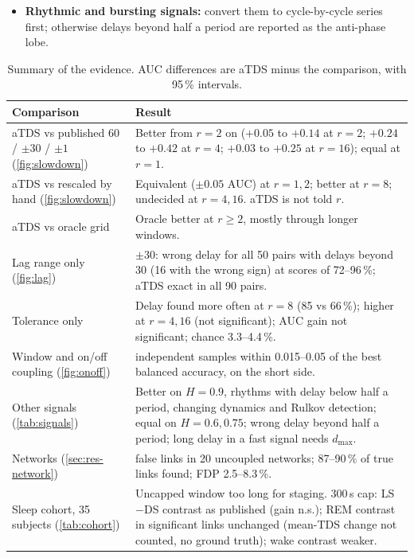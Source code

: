 \documentclass[11pt,a4paper]{article}
\begin{document}
\begin{itemize}
\item \textbf{Rhythmic and bursting signals:} convert them to cycle-by-cycle series first; otherwise delays beyond half a period are reported as the anti-phase lobe.
\end{itemize}

\begin{table}[t]
\centering
\caption{Summary of the evidence. AUC differences are aTDS minus the comparison, with 95\,\% intervals.}
\label{tab:summary}
\footnotesize
\begin{tabularx}{\textwidth}{>{\raggedright\arraybackslash}p{4.2cm}>{\raggedright\arraybackslash}X}
\toprule
Comparison & Result \\
\midrule
aTDS vs published 60 / $\pm30$ / $\pm1$ (\cref{fig:slowdown}) & Better from $r = 2$ on ($+0.05$ to $+0.14$ at $r = 2$; $+0.24$ to $+0.42$ at $r = 4$; $+0.03$ to $+0.25$ at $r = 16$); equal at $r = 1$. \\
aTDS vs rescaled by hand (\cref{fig:slowdown}) & Equivalent ($\pm0.05$ AUC) at $r = 1, 2$; better at $r = 8$; undecided at $r = 4, 16$. aTDS is not told $r$. \\
aTDS vs oracle grid & Oracle better at $r \ge 2$, mostly through longer windows. \\
Lag range only (\cref{fig:lag}) & $\pm30$: wrong delay for all 50 pairs with delays beyond 30 (16 with the wrong sign) at scores of 72--96\,\%; aTDS exact in all 90 pairs. \\
Tolerance only & Delay found more often at $r = 8$ (85 vs 66\,\%); higher at $r = 4, 16$ (not significant); AUC gain not significant; chance 3.3--4.4\,\%. \\
Window and on/off coupling (\cref{fig:onoff}) & 30 independent samples within 0.015--0.05 of the best balanced accuracy, on the short side. \\
Other signals (\cref{tab:signals}) & Better on $H = 0.9$, rhythms with delay below half a period, changing dynamics and Rulkov detection; equal on $H = 0.6, 0.75$; wrong delay beyond half a period; long delay in a fast signal needs $d_{\max}$. \\
Networks (\cref{sec:res-network}) & 0 false links in 20 uncoupled networks; 87--90\,\% of true links found; FDP 2.5--8.3\,\%. \\
Sleep cohort, 35 subjects (\cref{tab:cohort}) & Uncapped window too long for staging. 300\,s cap: LS$-$DS contrast as published (gain n.s.); REM contrast in significant links unchanged (mean-TDS change not counted, no ground truth); wake contrast weaker. \\

\end{tabularx}
\end{table}
\end{document}
